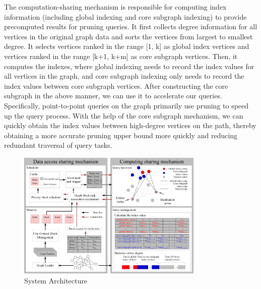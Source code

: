 \documentclass[lettersize,journal]{IEEEtran} %
\begin{document}
The computation-sharing mechanism is responsible for computing index information (including global indexing and core subgraph indexing) to provide precomputed results for pruning queries. It first collects degree information for all vertices in the original graph data and sorts the vertices from largest to smallest degree. It selects vertices ranked in the range [1, k] as global index vertices and vertices ranked in the range [k+1, k+m] as core subgraph vertices. Then, it computes the indexes, where global indexing needs to record the index values for all vertices in the graph, and core subgraph indexing only needs to record the index values between core subgraph vertices. After constructing the core subgraph in the above manner, we can use it to accelerate our queries. Specifically, point-to-point queries on the graph primarily use pruning to speed up the query process. With the help of the core subgraph mechanism, we can quickly obtain the index values between high-degree vertices on the path, thereby obtaining a more accurate pruning upper bound more quickly and reducing redundant traversal of query tasks.


\begin{figure}[!t]
\centering
\includegraphics[width=3.5in]{系统架构}
\caption{System Architecture}  
\label{系统架构}
\end{figure}
 
\end{document}
